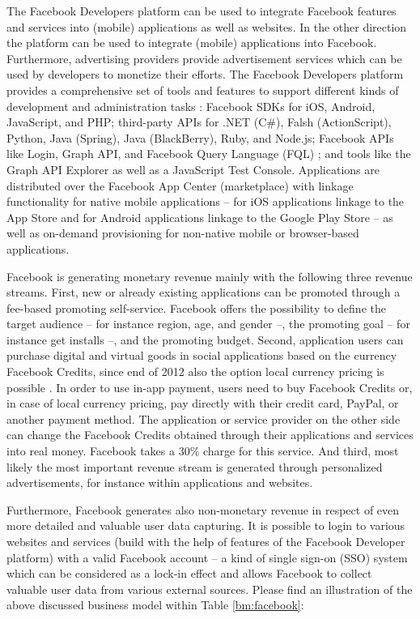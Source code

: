 The Facebook Developers platform can be used to integrate Facebook features and services into (mobile) applications as well as websites. In the other direction the platform can be used to integrate (mobile) applications into Facebook. Furthermore, advertising providers provide advertisement services which can be used by developers to monetize their efforts. The Facebook Developers platform provides a comprehensive set of tools and features to support different kinds of development and administration tasks \citep{Facebook2013a}: Facebook \acp{SDK} for iOS, Android, JavaScript, and PHP; third-party \acp{API} for .NET (C\#), Falsh (ActionScript), Python, Java (Spring), Java (BlackBerry), Ruby, and Node.js; Facebook \acp{API} like Login, Graph \ac{API}, and Facebook Query Language (FQL) ; and tools like the Graph \ac{API} Explorer as well as a JavaScript Test Console. Applications are distributed over the Facebook App Center (marketplace) with linkage functionality for native mobile applications -- for iOS applications linkage to the App Store and for Android applications linkage to the Google Play Store -- as well as on-demand provisioning for non-native mobile or browser-based applications.

Facebook is generating monetary revenue mainly with the following three revenue streams. First, new or already existing applications can be promoted through a fee-based promoting self-service. Facebook offers the possibility to define the target audience -- for instance region, age, and gender --, the promoting goal -- for instance get installs --, and the promoting budget. Second, application users can purchase digital and virtual goods in social applications based on the currency Facebook Credits, since end of 2012 also the option local currency pricing is possible \citep{Facebook2013a}. In order to use in-app payment, users need to buy Facebook Credits or, in case of local currency pricing, pay directly with their credit card, PayPal, or another payment method. The application or service provider on the other side can change the Facebook Credits obtained through their applications and services into real money. Facebook takes a 30\% charge for this service. And third, most likely the most important revenue stream is generated through personalized advertisements, for instance within applications and websites.

Furthermore, Facebook generates also non-monetary revenue in respect of even more detailed and valuable user data capturing. It is possible to login to various websites and services (build with the help of features of the Facebook Developer platform) with a valid Facebook account -- a kind of single sign-on (SSO) system which can be considered as a lock-in effect and allows Facebook to collect valuable user data from various external sources. Please find an illustration of the above discussed business model within Table \ref{bm:facebook}:

